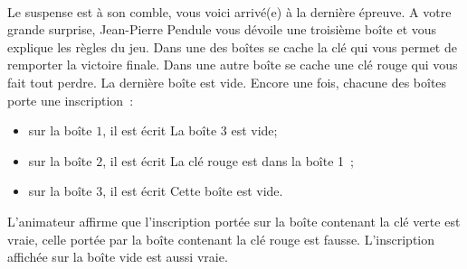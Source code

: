 \documentclass[11pt,a4paper]{article}
\begin{document}
\begin{Exercise}[title = {Logique et calcul des propositions}, origin = {\bac \; {\sc ccinp 2018 - mp}}]
	\ExePart[name = {Troisième épreuve}]\\
	Le suspense est à son comble, vous voici arrivé(e) à la dernière épreuve.
	A votre grande surprise, Jean-Pierre Pendule vous dévoile une troisième boîte et vous explique les règles du jeu.
	Dans une des boîtes se cache la clé qui vous permet de remporter la victoire finale.
	Dans une autre boîte se cache une clé rouge qui vous fait tout perdre.
	La dernière boîte est vide.
	Encore une fois, chacune des boîtes porte une inscription~:
	\begin{itemize}
		\item sur la boîte $1$, il est écrit \og{}La boîte 3 est vide\fg{};
		\item  sur la boîte $2$, il est écrit \og{}La clé rouge est dans la boîte 1\fg{}~;
		\item  sur la boîte $3$, il est écrit \og{}Cette boîte est vide\fg{}.
	\end{itemize}
	L'animateur affirme que l'inscription portée sur la boîte contenant la clé verte est vraie, celle portée par la boîte contenant la clé rouge est fausse.
	L'inscription affichée sur la boîte vide est aussi vraie.
\end{Exercise}
\end{document}
